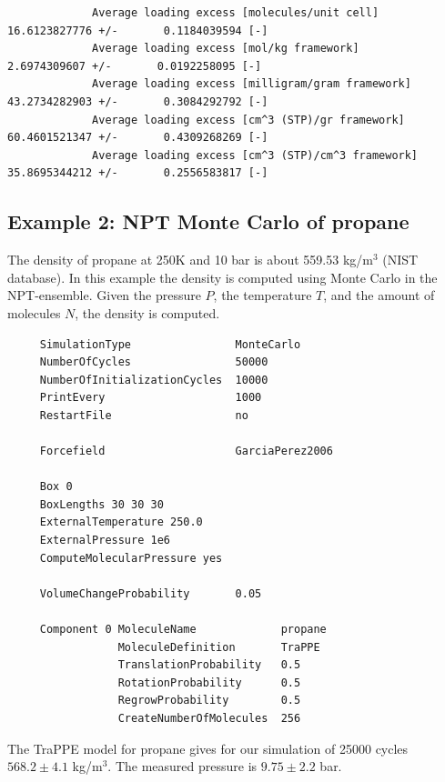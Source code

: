 \begin{tiny}
\begin{verbatim}
             Average loading excess [molecules/unit cell]       16.6123827776 +/-       0.1184039594 [-]
             Average loading excess [mol/kg framework]          2.6974309607 +/-       0.0192258095 [-]
             Average loading excess [milligram/gram framework]         43.2734282903 +/-       0.3084292792 [-]
             Average loading excess [cm^3 (STP)/gr framework]         60.4601521347 +/-       0.4309268269 [-]
             Average loading excess [cm^3 (STP)/cm^3 framework]         35.8695344212 +/-       0.2556583817 [-]
\end{verbatim}
\end{tiny}


\subsection*{Example 2: NPT Monte Carlo of propane}

The density of propane at 250K and 10 bar is about 559.53 kg/m$^3$ (NIST database). In this example the density is
computed using Monte Carlo in the NPT-ensemble. Given the pressure $P$, the temperature $T$, and the amount of molecules $N$,
the density is computed.

\begin{tiny}
\begin{verbatim}
     SimulationType                MonteCarlo
     NumberOfCycles                50000
     NumberOfInitializationCycles  10000
     PrintEvery                    1000
     RestartFile                   no
     
     Forcefield                    GarciaPerez2006
     
     Box 0
     BoxLengths 30 30 30
     ExternalTemperature 250.0
     ExternalPressure 1e6
     ComputeMolecularPressure yes
     
     VolumeChangeProbability       0.05
     
     Component 0 MoleculeName             propane
                 MoleculeDefinition       TraPPE
                 TranslationProbability   0.5
                 RotationProbability      0.5
                 RegrowProbability        0.5
                 CreateNumberOfMolecules  256
\end{verbatim}
\end{tiny}

The TraPPE model for propane gives for our simulation of 25000 cycles $568.2\pm 4.1$ kg/m$^3$.
The measured pressure is $9.75\pm2.2$ bar.


